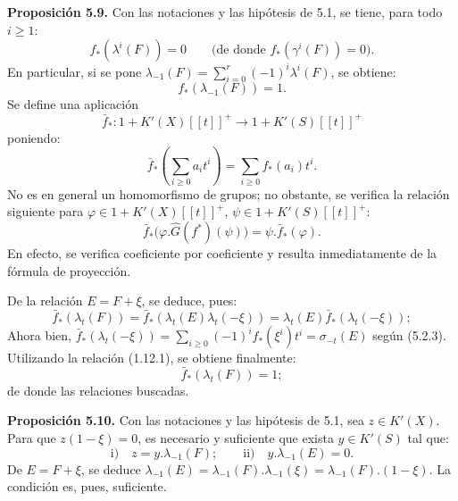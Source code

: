 \providecommand{\sisi}[2]{#2}

\textbf{Proposición 5.9.} Con las notaciones y las hipótesis de 5.1, se tiene, para todo $i\ge 1$:
\[
  f_*(\lambda^i(F))=0\qquad\bigl(\text{de donde }f_*(\gamma^i(F))=0\bigr).
\]
En particular, si se pone $\lambda_{-1}(F)=\sum_{i=0}^{r}(-1)^i\lambda^i(F)$, se obtiene:
\[
  f_*(\lambda_{-1}(F))=1.
\]
Se define una aplicación
\[
  \bar f_*:1+K'(X)[[t]]^+\longrightarrow 1+K'(S)[[t]]^+
\]
poniendo:
\[
  \bar f_*\left(\sum_{i\ge0}a_it^i\right)=\sum_{i\ge0}f_*(a_i)t^i .
\]
No es en general un homomorfismo de grupos; no obstante, se verifica la relación siguiente para $\varphi\in 1+K'(X)[[t]]^+$, $\psi\in 1+K'(S)[[t]]^+$:
\[
  \bar f_*\bigl(\varphi.\hat G(f^*)(\psi)\bigr)=\psi.\bar f_*(\varphi).
\]
En efecto, se verifica coeficiente por coeficiente y resulta inmediatamente de la fórmula de proyección.

De la relación $E=F+\xi$, se deduce, pues:
\[
  \sisi{\bar f}{\bar f_*}(\lambda_t(F))=
  \bar f_*(\lambda_t(E)\lambda_t(-\xi))=
  \lambda_t(E)\bar f_*(\lambda_t(-\xi));
\]
Ahora bien, $\sisi{\bar f}{\bar f_*}(\lambda_t(-\xi))=\sum_{i\ge0}(-1)^if_*(\xi^i)t^i=\sigma_{-t}(E)$ según \sisi{(4.2.3)}{(5.2.3)}. Utilizando la relación (1.12.1), se obtiene finalmente:
\[
  \bar f_*(\lambda_t(F))=1;
\]
de donde las relaciones buscadas.

\textbf{Proposición 5.10.} Con las notaciones y las hipótesis de 5.1, sea $z\in K'(X)$. Para que $z(1-\xi)=0$, es necesario y suficiente que exista $y\in K'(S)$ tal que:
\[
  \text{i)}\quad z=y.\lambda_{-1}(F);
  \qquad
  \text{ii)}\quad y.\lambda_{-1}(E)=0.
\]
De $E=F+\xi$, se deduce $\lambda_{-1}(E)=\lambda_{-1}(F).\lambda_{-1}(\xi)=\lambda_{-1}(F).(1-\xi)$. La condición es, pues, suficiente.

